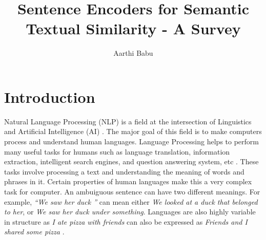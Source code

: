 \documentclass[12pt]{report} %
\title{Sentence Encoders for Semantic Textual Similarity - A Survey}
\author{Aarthi Babu}
\begin{document}
\maketitle
\tableofcontents
\newpage



\chapter{Introduction}

	   
	Natural Language Processing (NLP) is a field at the intersection of Linguistics and Artificial Intelligence (AI) \citep{jurafsky2014speech}. The major goal of this field is to make computers process and understand human languages. Language Processing helps to perform many useful tasks for humans such as language translation, information extraction, intelligent search engines, and question answering system, etc \citep{jurafsky2014speech}. These tasks involve processing a text and understanding the meaning of words and phrases in it. Certain properties of human languages make this a very complex task for computer.  An ambuiguous sentence can have two different meanings. For example, \textit{\textquotedblleft We saw her duck \textquotedblright} can mean either \textit{We looked at a duck that belonged to her}, or \textit{We saw her duck under something}. Languages are also highly variable in structure as \textit{I ate pizza with friends} can also be expressed as \textit{Friends and I shared some pizza} \citep{jurafsky2014speech}. %
	
\end{document}
